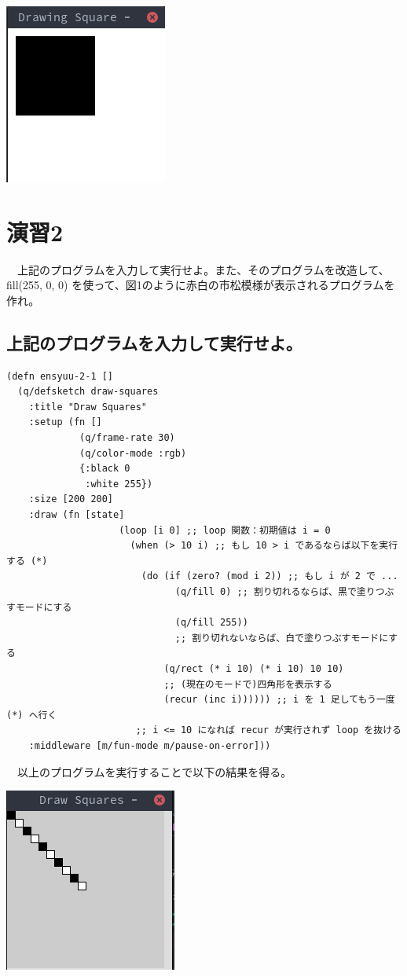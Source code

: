 \documentclass{scrartcl}
\begin{document}
\begin{center}
\includegraphics[width=0.3\linewidth]{./img/ensyuu1.png}
\end{center}
\section{演習2}
\label{sec:org5ce3664}
　上記のプログラムを入力して実行せよ。また、そのプログラムを改造して、 fill(255, 0, 0) を使って、図1のように赤白の市松模様が表示されるプログラムを作れ。\\
\subsection{上記のプログラムを入力して実行せよ。}
\label{sec:org0ccfd83}
\begin{verbatim}
(defn ensyuu-2-1 []
  (q/defsketch draw-squares
    :title "Draw Squares"
    :setup (fn []
             (q/frame-rate 30)
             (q/color-mode :rgb)
             {:black 0
              :white 255})
    :size [200 200]
    :draw (fn [state]
                    (loop [i 0] ;; loop 関数：初期値は i = 0
                      (when (> 10 i) ;; もし 10 > i であるならば以下を実行する (*)
                        (do (if (zero? (mod i 2)) ;; もし i が 2 で ...
                              (q/fill 0) ;; 割り切れるならば、黒で塗りつぶすモードにする
                              (q/fill 255)) 
                              ;; 割り切れないならば、白で塗りつぶすモードにする
                            (q/rect (* i 10) (* i 10) 10 10) 
                            ;; (現在のモードで)四角形を表示する
                            (recur (inc i)))))) ;; i を 1 足してもう一度 (*) へ行く
                       ;; i <= 10 になれば recur が実行されず loop を抜ける
    :middleware [m/fun-mode m/pause-on-error]))
\end{verbatim}
　以上のプログラムを実行することで以下の結果を得る。\\
\begin{center}
\includegraphics[width=0.3\linewidth]{./img/ensyuu2.png}
\end{center}
\end{document}
